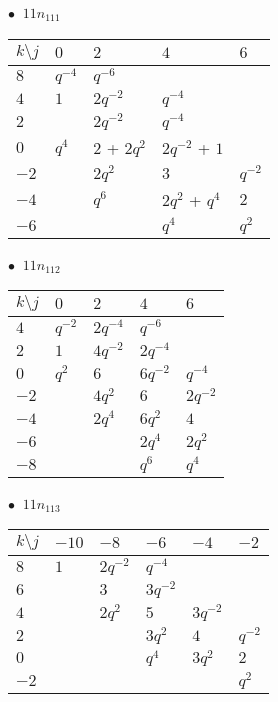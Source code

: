 %
\begin{minipage}{\linewidth}
$\bullet\ $ $11n_{111}$ \vspace{0.5em} \\
\begin{tabular}{l|llll}
$k \setminus j$ & $0$ & $2$ & $4$ & $6$ \\
\hline
$8$ & $q^{-4}$ & $q^{-6}$ &  &  \\
$4$ & $1$ & $2q^{-2}$ & $q^{-4}$ &  \\
$2$ &  & $2q^{-2}$ & $q^{-4}$ &  \\
$0$ & $q^{4}$ & $2$ + $2q^{2}$ & $2q^{-2}$ + $1$ &  \\
$-2$ &  & $2q^{2}$ & $3$ & $q^{-2}$ \\
$-4$ &  & $q^{6}$ & $2q^{2}$ + $q^{4}$ & $2$ \\
$-6$ &  &  & $q^{4}$ & $q^{2}$ \\
\end{tabular}
\vspace{2em}
\end{minipage}
%
\begin{minipage}{\linewidth}
$\bullet\ $ $11n_{112}$ \vspace{0.5em} \\
\begin{tabular}{l|llll}
$k \setminus j$ & $0$ & $2$ & $4$ & $6$ \\
\hline
$4$ & $q^{-2}$ & $2q^{-4}$ & $q^{-6}$ &  \\
$2$ & $1$ & $4q^{-2}$ & $2q^{-4}$ &  \\
$0$ & $q^{2}$ & $6$ & $6q^{-2}$ & $q^{-4}$ \\
$-2$ &  & $4q^{2}$ & $6$ & $2q^{-2}$ \\
$-4$ &  & $2q^{4}$ & $6q^{2}$ & $4$ \\
$-6$ &  &  & $2q^{4}$ & $2q^{2}$ \\
$-8$ &  &  & $q^{6}$ & $q^{4}$ \\
\end{tabular}
\vspace{2em}
\end{minipage}
%
\begin{minipage}{\linewidth}
$\bullet\ $ $11n_{113}$ \vspace{0.5em} \\
\begin{tabular}{l|lllll}
$k \setminus j$ & $-10$ & $-8$ & $-6$ & $-4$ & $-2$ \\
\hline
$8$ & $1$ & $2q^{-2}$ & $q^{-4}$ &  &  \\
$6$ &  & $3$ & $3q^{-2}$ &  &  \\
$4$ &  & $2q^{2}$ & $5$ & $3q^{-2}$ &  \\
$2$ &  &  & $3q^{2}$ & $4$ & $q^{-2}$ \\
$0$ &  &  & $q^{4}$ & $3q^{2}$ & $2$ \\
$-2$ &  &  &  &  & $q^{2}$ \\
\end{tabular}
\vspace{2em}
\end{minipage}

